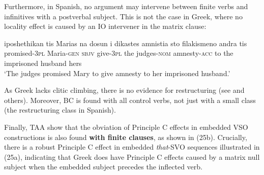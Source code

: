 \documentclass[output=paper]{langsci/langscibook}
\begin{document}
\ea%
    \label{ex:alexiadou:22}
    \z
\z   


Furthermore, in Spanish, no argument may intervene between finite verbs and infinitives with a postverbal subject. This is not the case in Greek, where no locality effect is caused by an IO intervener in the matrix clause:

\begin{exe}%
\end{exe}

  

\ea%
    \label{ex:alexiadou:24}
    \gll iposhethikan     tis Marias  na  dosun       i dikastes     amnistia   sto filakismeno      andra     tis\\
         promised-\textsc{3pl}    Maria-\textsc{gen} \textsc{sbjv} give-\textsc{3pl} the judges-\textsc{nom}   amnesty-\textsc{acc} to the imprisoned husband hers\\
    \glt   ‘The judges promised Mary to give amnesty to her imprisoned husband.’
    \z

As Greek lacks clitic climbing, there is no evidence for restructuring (see \citealt{Terzi1992} and others). Moreover, BC is found with all control verbs, not just with a small class (the restructuring class in Spanish).

Finally, TAA show that the obviation of Principle C effects in embedded VSO constructions is also found \textbf{with finite clauses}, as shown in (25b). Crucially, there is a robust Principle C effect in embedded \textit{that}{}-SVO sequences illustrated in (25a), indicating that Greek does have Principle C effects caused by a matrix null subject when the embedded subject precedes the inflected verb.
\end{document}
